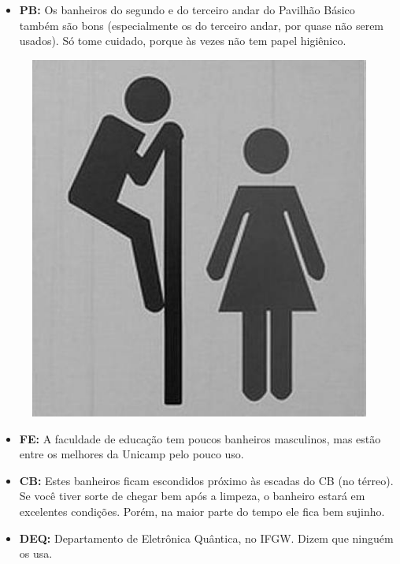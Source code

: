\begin{itemize}
\item  \textbf{PB:} Os banheiros do segundo e do terceiro andar do Pavilhão Básico também são bons (especialmente os do terceiro andar, por quase não serem usados). Só tome cuidado, porque às vezes não tem papel higiênico.
\end{itemize}

\begin{figure}[h!]
    \centering
    \includegraphics[scale=0.50, keepaspectratio=true]{img/imgs/12-melhores_banheiros/banheiro.jpg}
\end{figure}
\begin{itemize}
\item  \textbf{FE:} A faculdade de educação tem poucos banheiros masculinos, mas estão entre os melhores da Unicamp pelo pouco uso.
\end{itemize}

\begin{itemize}
\item  \textbf{CB:} Estes banheiros ficam escondidos próximo às escadas do CB (no térreo). Se você tiver sorte de chegar bem após a limpeza, o banheiro estará em excelentes condições. Porém, na maior parte do tempo ele fica bem sujinho.
\end{itemize}

\begin{itemize}
\item  \textbf{DEQ:} Departamento de Eletrônica Quântica, no IFGW. Dizem que ninguém os usa.
\end{itemize}

